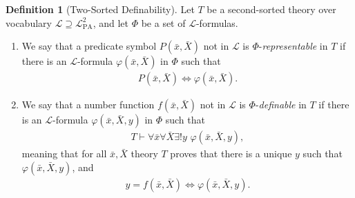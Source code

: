 \documentclass{article}
\theoremstyle{definition}
\newtheorem{df}{Definition}
\theoremstyle{theorem}
\theoremstyle{theorem}
\theoremstyle{remark}
\theoremstyle{remark}
\theoremstyle{example}
\theoremstyle{notation}
\theoremstyle{theorem}
\begin{document}
\begin{df}[Two-Sorted Definability] Let $T$ be a second-sorted theory over vocabulary $\mathcal{L}\supseteq\mathcal{L}^2_{\mathrm{PA}}$, and let $\Phi$ be a set of $\mathcal{L}$-formulas. 
\begin{enumerate}
    \item We say that a predicate symbol $P(\bar x, \bar X)$ not in $\mathcal{L}$ is $\Phi$-\emph{representable} in $T$ if there is an $\mathcal{L}$-formula $\varphi(\bar x,\bar X)$ in $\Phi$ such that
    \begin{gather}\label{ajajaaa}
       P(\bar x, \bar X) \iff \varphi(\bar x,\bar X).
    \end{gather}

    \item We say that a number function $f(\bar x, \bar X)$ not in $\mathcal{L}$ is $\Phi$-\emph{definable} in $T$ if there is an $\mathcal{L}$-formula $\varphi(\bar x,\bar X,y)$ in $\Phi$ such that
\begin{gather}
    T\vdash \forall \bar x\forall \bar X\exists !y\,\,\varphi(\bar x,\bar X, y),
\end{gather}
    meaning that for all $\bar x,\bar X$ theory $T$ proves that there is a unique $y$ such that $\varphi(\bar x,\bar X, y)$, and  
\begin{gather}\label{alalksldjlkh}
    y = f(\bar x, \bar X)\iff \varphi(\bar x,\bar X, y).
\end{gather} 


\end{enumerate}
\end{df}
\end{document}
